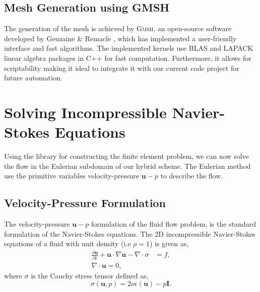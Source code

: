 \subsection{Mesh Generation using GMSH}
\label{subsec:mgugmsh}

The generation of the mesh is achieved by \textsc{Gmsh}, an open-source software developed by Geuzaine \& Remacle \cite{Geuzaine2009b}, which has implemented a user-friendly interface and fast algorithms. The \gmsh implemented kernels use \textsc{BLAS} and LAPACK linear algebra packages in C++ for fast computation. Furthermore, it allows for scriptability making it ideal to integrate it with our current \python code project for future automation.

\section{Solving Incompressible Navier-Stokes Equations}
\label{sec:e-sinse}

Using the \dolfin library for constructing the finite element problem, we can now solve the flow in the Eulerian subdomain of our hybrid scheme. The Eulerian method use the primitive variables velocity-pressure $\mathbf{u}-p$ to describe the flow.

\subsection{Velocity-Pressure Formulation}
The velocity-pressure $\mathbf{u}-p$ formulation of the fluid flow problem, is the standard formulation of the Navier-Stokes equations. The 2D incompressible Navier-Stokes equations of a fluid with unit density (i.e $\rho = 1$) is given as,
	\begin{subequations}
	\begin{align}
	\frac{\partial \mathbf{u}}{\partial t} + \mathbf{u}\cdot\nabla\mathbf{u} - \nabla \cdot \sigma &= f,\\
	\nabla \cdot \mathbf{u} = 0,
	\end{align}	
	\label{eq:2Dns}
	\end{subequations}
where $\sigma$ is the Cauchy stress tensor defined as,
	\begin{equation}
	\sigma(\mathbf{u},p) = 2\nu\epsilon(\mathbf{u}) - p\mathbf{I}.
	\label{eq:stressTensor}
	\end{equation}


